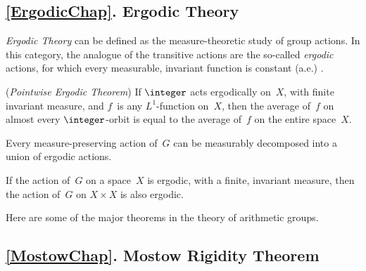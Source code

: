 \smallbreak

\subsection*{\cref{ErgodicChap}. Ergodic Theory}
\emph{Ergodic Theory} can be defined as the measure-theoretic study of group actions. In this category, the analogue of the transitive actions are the so-called \emph{ergodic} actions, for which every measurable, invariant function is constant (a.e.) . 

%

\smallbreak

 (\emph{Pointwise Ergodic Theorem})
If $\integer$ acts ergodically on~$X$, with finite invariant measure, and $f$~is any $L^1$-function on~$X$, then the average of~$f$ on almost every $\integer$-orbit is equal to the average of~$f$ on the entire space~$X$.

\smallbreak

Every measure-preserving action of~$G$ can be measurably decomposed into a union of ergodic actions.

\smallbreak

If the action of~$G$ on a space~$X$ is ergodic, with a finite, invariant measure, then the action of~$G$ on $X \times X$ is also ergodic.













Here are some of the major theorems in the theory of arithmetic groups.

\subsection*{\cref{MostowChap}. Mostow Rigidity Theorem} \ 

